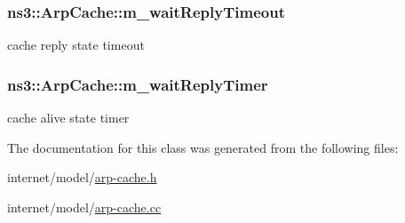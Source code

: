 \subsubsection[{\texorpdfstring{m\+\_\+wait\+Reply\+Timeout}{m_waitReplyTimeout}}]{ ns3\+::\+Arp\+Cache\+::m\+\_\+wait\+Reply\+Timeout\hspace{0.3cm}{\ttfamily [private]}}\hypertarget{classns3_1_1ArpCache_a4369a983ccf79656dbe6066b5fe91814}{}\label{classns3_1_1ArpCache_a4369a983ccf79656dbe6066b5fe91814}


cache reply state timeout 

\subsubsection[{\texorpdfstring{m\+\_\+wait\+Reply\+Timer}{m_waitReplyTimer}}]{ ns3\+::\+Arp\+Cache\+::m\+\_\+wait\+Reply\+Timer\hspace{0.3cm}{\ttfamily [private]}}\hypertarget{classns3_1_1ArpCache_a2725853dd931117b4d49b95b036f6d2b}{}\label{classns3_1_1ArpCache_a2725853dd931117b4d49b95b036f6d2b}


cache alive state timer 



The documentation for this class was generated from the following files\+:\begin{DoxyCompactItemize}
\item 
internet/model/\hyperlink{arp-cache_8h}{arp-\/cache.\+h}\item 
internet/model/\hyperlink{arp-cache_8cc}{arp-\/cache.\+cc}\end{DoxyCompactItemize}
